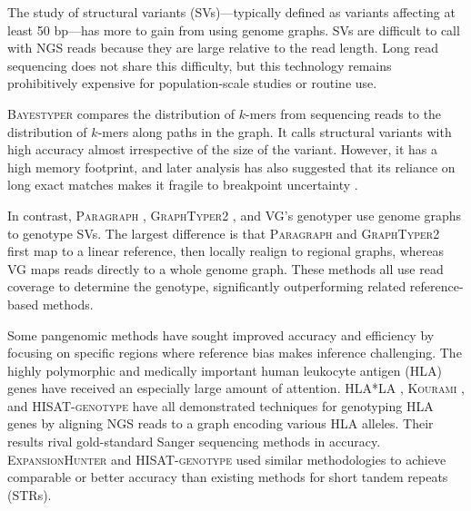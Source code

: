 The study of structural variants (SVs)---typically defined as variants affecting at least 50 bp---has more to gain from using genome graphs.
SVs are difficult to call with NGS reads because they are large relative to the read length.
Long read sequencing does not share this difficulty, but this technology remains prohibitively expensive for population-scale studies or routine use.

\textsc{Bayestyper} \cite{sibbesen2018accurate} compares the distribution of $k$-mers from sequencing reads to the distribution of $k$-mers along paths in the graph.
It calls structural variants with high accuracy almost irrespective of the size of the variant.
However, it has a high memory footprint, and later analysis has also suggested that its reliance on long exact matches makes it fragile to breakpoint uncertainty \cite{hickey2019genotyping}.

In contrast, \textsc{Paragraph} \cite{chen2019paragraph}, \textsc{GraphTyper2} \cite{eggertsson2019graphtyper2}, and \textsc{VG}'s genotyper \cite{hickey2019genotyping} use genome graphs to genotype SVs.
The largest difference is that \textsc{Paragraph} and \textsc{GraphTyper2} first map to a linear reference, then locally realign to regional graphs, whereas VG maps reads directly to a whole genome graph.
These methods all use read coverage to determine the genotype, significantly outperforming related reference-based methods.

Some pangenomic methods have sought improved accuracy and efficiency by focusing on specific regions where reference bias makes inference challenging. 
The highly polymorphic and medically important human leukocyte antigen (HLA) genes have received an especially large amount of attention.
\textsc{HLA*LA} \cite{dilthey2019hla}, \textsc{Kourami} \cite{lee2018kourami}, and \textsc{HISAT-genotype} \cite{Kim_2019} have all demonstrated techniques for genotyping HLA genes by aligning NGS reads to a graph encoding various HLA alleles.
Their results rival gold-standard Sanger sequencing methods in accuracy.
\textsc{ExpansionHunter} \cite{dolzhenko2019expansionhunter} and \textsc{HISAT-genotype} \cite{Kim_2019} used similar methodologies to achieve comparable or better accuracy than existing methods for short tandem repeats (STRs).

